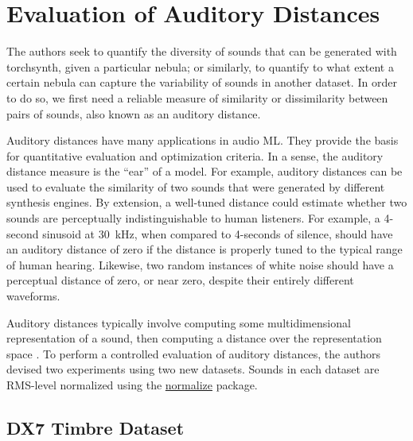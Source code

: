 




\section{Evaluation of Auditory Distances}

The authors seek to quantify the diversity of sounds that can be generated with torchsynth, given a particular nebula; or similarly, to quantify to what extent a certain nebula can capture the variability of sounds in another dataset. In order to do so, we first need a reliable measure of similarity or dissimilarity between pairs of sounds, also known as an auditory distance. 

Auditory distances have many applications in audio ML. They provide the basis for quantitative evaluation and optimization criteria. In a sense, the auditory distance measure is the ``ear'' of a model. For example, auditory distances can be used to evaluate the similarity of two sounds that were generated by different synthesis engines. By extension, a well-tuned distance could estimate whether two sounds are perceptually indistinguishable to human listeners. For example, a 4-second sinusoid at 30~kHz, when compared to 4-seconds of silence, should have an auditory distance of zero if the distance is properly tuned to the typical range of human hearing. Likewise, two random instances of white noise should have a perceptual distance of zero, or near zero, despite their entirely different waveforms.

Auditory distances typically involve computing some multidimensional representation of a sound, then computing a distance over the representation space \cite{turian2020im}.
To perform a controlled evaluation of auditory distances, the authors devised two experiments using two new datasets.
Sounds in each dataset are RMS-level normalized using the \href{https://github.com/kklobe/normalize}{normalize} package.



\subsection{DX7 Timbre Dataset}
\label{sec:dx7}

